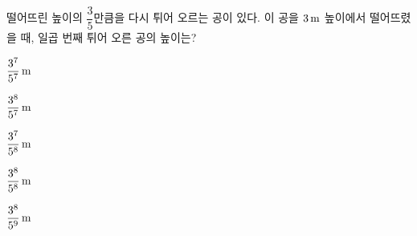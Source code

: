 떨어뜨린 높이의 $\dfrac{3}{5}$만큼을 다시 튀어 오르는 공이 있다. 이 공을 $3\mkern3mu \mathrm{m}$ 높이에서 떨어뜨렸을 때, 일곱 번째 튀어 오른 공의 높이는?
\begin{choicesii}{\rule[-3ex]{0pt}{8ex}$\dfrac{3^{7}}{5^{7}}\mkern3mu \mathrm{m}$}{\rule[-3ex]{0pt}{8ex}$\dfrac{3^{8}}{5^{7}}\mkern3mu \mathrm{m}$}{\rule[-3ex]{0pt}{8ex}$\dfrac{3^{7}}{5^{8}}\mkern3mu \mathrm{m}$}{\rule[-3ex]{0pt}{8ex}$\dfrac{3^{8}}{5^{8}}\mkern3mu \mathrm{m}$}{\rule[-3ex]{0pt}{8ex}$\dfrac{3^{8}}{5^{9}}\mkern3mu \mathrm{m}$}\end{choicesii}
